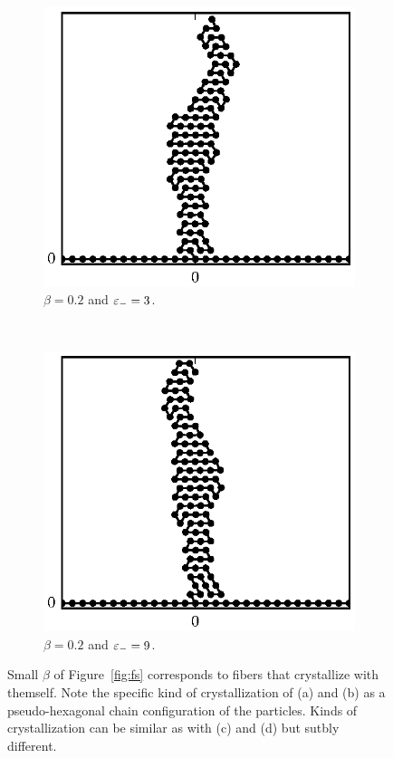 \begin{figure}[h!]
		\begin{subfigure}{.5\textwidth}
			\centering
			\includegraphics{./fig/ch3/fs/b0.2_eb3.eps}
			\caption{$\beta=0.2$ and $\varepsilon_-=3$.\label{subfig:crystal1}}
		\end{subfigure}%
		~
		\begin{subfigure}{.5\textwidth}
			\centering
			\includegraphics{./fig/ch3/fs/b0.2_eb9.eps}
			\caption{$\beta=0.2$ and $\varepsilon_-=9$.\label{subfig:crystal2}}
		\end{subfigure}	
		\caption{Small $\beta$ of Figure~\ref{fig:fs} corresponds to fibers that crystallize with themself. Note the specific kind of crystallization of (a) and (b) as a pseudo-hexagonal chain configuration of the particles. Kinds of crystallization can be similar as with (c) and (d) but sutbly different.\label{fig:crystal}}	
	\end{figure}


